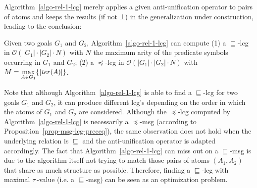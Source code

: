Algorithm~\ref{algo-rel-1-lcg} merely applies a given anti-unification operator to pairs of atoms and keeps the results (if not $\bot$) in the generalization under construction, leading to the conclusion:
\begin{theorem}\label{thm-ausqsubseteq}
	Given two goals $G_1$ and $G_2$, Algorithm~\ref{algo-rel-1-lcg} can compute (1) a $\sqsubseteq$-lcg in $\mathcal{O}(|G_1|\cdot |G_2|\cdot N)$ with $N$ the maximum arity of the predicate symbols occurring in $G_1$ and $G_2$; (2) a $\preceq$-lcg in $\mathcal{O}(|G_1|\cdot |G_2|\cdot N)$ with $M = \underset{A\in G_1}{\max}\{|\mathit{ter}(A)|\}$. 
\end{theorem}

Note that although Algorithm~\ref{algo-rel-1-lcg} is able to find a $\sqsubseteq$-lcg for two goals $G_1$ and $G_2$, it can produce different lcg's depending on the order in which the atoms of $G_1$ and $G_2$ are considered. %
%	
Although the $\preceq$-lcg computed by Algorithm~\ref{algo-rel-1-lcg} is necessarily a $\preceq$-msg (according to Proposition~\ref{prop-msg-lcg-preceq}), the same observation does not hold when the underlying relation is $\sqsubseteq$ and the anti-unification operator is adapted accordingly. The fact that Algorithm~\ref{algo-rel-1-lcg} can miss out on a $\sqsubseteq$-msg is due to the algorithm itself not trying to match those pairs of atoms $(A_1, A_2)$ that share as much structure as possible. Therefore, finding a $\sqsubseteq$-lcg with maximal $\tau$-value (i.e. a $\sqsubseteq$-msg) can be seen as an optimization problem.

